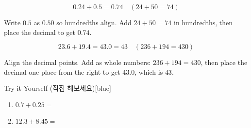 \documentclass[12pt]{book}
\begin{document}



\[
0.24 + 0.5 = 0.74 \quad (24 + 50 = 74)
\]

Write $0.5$ as $0.50$ so hundredths align.  
Add $24+50=74$ in hundredths, then place the decimal to get $0.74$.




\[
23.6 + 19.4 = 43.0 = 43 \quad (236 + 194 = 430)
\]

Align the decimal points.  
Add as whole numbers: $236+194=430$, then place the decimal one place from the right to get $43.0$, which is $43$.


\begin{flexbox}{Try it Yourself (직접 해보세요)}[blue]
\begin{enumerate}
  \item $0.7 + 0.25=$ \vspace*{20pt}
  \item $12.3 + 8.45=$ \vspace*{20pt}
\end{enumerate}
\end{flexbox}



\end{document}
